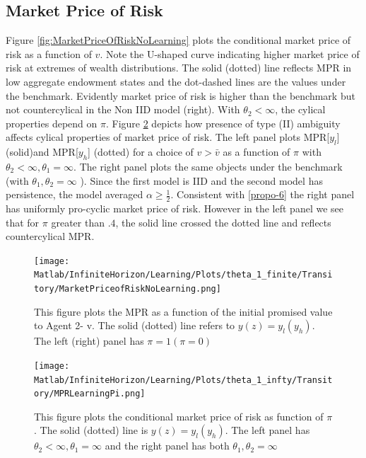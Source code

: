 \documentclass[12pt]{article}
\begin{document}
\subsection{Market Price of Risk}
\label{sec-MPR}
Figure \ref{fig:MarketPriceOfRiskNoLearning} plots the conditional market price of risk as a function of $v$. Note the U-shaped curve indicating higher market price of risk at extremes of wealth distributions. The solid (dotted) line reflects MPR in low aggregate endowment states and the dot-dashed lines are the values under the benchmark. Evidently market price of risk is higher than the benchmark but not countercylical in the Non IID model (right). With $\theta_2 < \infty$, the cylical properties depend on $\pi$. Figure \ref{fig:MPRLearningPi} depicts how presence of type (II) ambiguity affects cylical properties of market price of risk. The left panel plots MPR[$y_l$] (solid)and MPR[$y_h$] (dotted) for a choice of $v > \bar{v}$ as a function of $\pi$ with $\theta_2<\infty,\theta_1=\infty$. The right panel plots the same objects under the benchmark (with $\theta_1,\theta_2=\infty$ ). Since the first model is IID and the second model has persistence, the model averaged $\alpha\geq\frac{1}{2}$. Consistent 
with \ref{propo-6} the right panel has uniformly pro-cyclic market price of risk. However in the left panel we see that for $\pi$ greater than $.4$, the solid line crossed the dotted line and reflects countercylical MPR.
\begin{figure}[htbp]
\centering
	  \texttt{[image: Matlab/InfiniteHorizon/Learning/Plots/theta\_1\_finite/Transitory/MarketPriceofRiskNoLearning.png]}

	\caption{\small {This figure plots the MPR as a function of the initial promised
value to Agent 2- v. The  solid (dotted) line refers to $y(z)=y_l (y_h)$. The
left (right) panel has $\pi=1 (\pi=0)$}}
	\label{fig:MPRNoLearning}
\end{figure} 

\begin{figure}[htbp]
\centering
	  \texttt{[image: Matlab/InfiniteHorizon/Learning/Plots/theta\_1\_infty/Transitory/MPRLearningPi.png]}

	\caption{ This figure plots the conditional market price of risk as function of $\pi$. The solid (dotted) line is $y(z)=y_l (y_h)$. The left panel has $\theta_2<\infty,\theta_1=\infty $ and the right panel has both $\theta_1,\theta_2=\infty$}
 
	\label{fig:MPRLearningPi}
\end{figure} 
\end{document}
